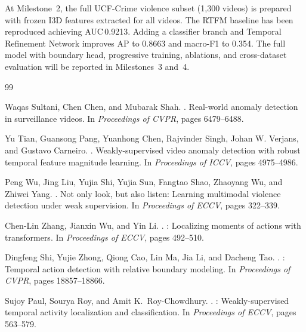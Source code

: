 \documentclass[11pt]{article}
\begin{document}
At Milestone~2, the full UCF-Crime violence subset (1,300 videos) is prepared
with frozen I3D features extracted for all videos.
The RTFM baseline has been reproduced achieving AUC\,0.9213.
Adding a classifier branch and Temporal Refinement Network improves AP to 0.8663
and macro-F1 to 0.354.
The full model with boundary head, progressive training, ablations, and
cross-dataset evaluation will be reported in Milestones~3 and~4.


\begin{thebibliography}{99}


Waqas Sultani, Chen Chen, and Mubarak Shah.
.
\newblock Real-world anomaly detection in surveillance videos.
\newblock In \textit{Proceedings of CVPR}, pages 6479--6488.

Yu Tian, Guansong Pang, Yuanhong Chen, Rajvinder Singh,
  Johan W. Verjans, and Gustavo Carneiro.
.
\newblock Weakly-supervised video anomaly detection with robust temporal
  feature magnitude learning.
\newblock In \textit{Proceedings of ICCV}, pages 4975--4986.

Peng Wu, Jing Liu, Yujia Shi, Yujia Sun, Fangtao Shao,
  Zhaoyang Wu, and Zhiwei Yang.
.
\newblock Not only look, but also listen: Learning multimodal violence
  detection under weak supervision.
\newblock In \textit{Proceedings of ECCV}, pages 322--339.

Chen-Lin Zhang, Jianxin Wu, and Yin Li.
.
: Localizing moments of actions with transformers.
\newblock In \textit{Proceedings of ECCV}, pages 492--510.

Dingfeng Shi, Yujie Zhong, Qiong Cao, Lin Ma, Jia Li, and Dacheng Tao.
.
: Temporal action detection with relative boundary modeling.
\newblock In \textit{Proceedings of CVPR}, pages 18857--18866.

Sujoy Paul, Sourya Roy, and Amit K.\ Roy-Chowdhury.
.
: Weakly-supervised temporal activity localization and
  classification.
\newblock In \textit{Proceedings of ECCV}, pages 563--579.


\end{thebibliography}
\end{document}
